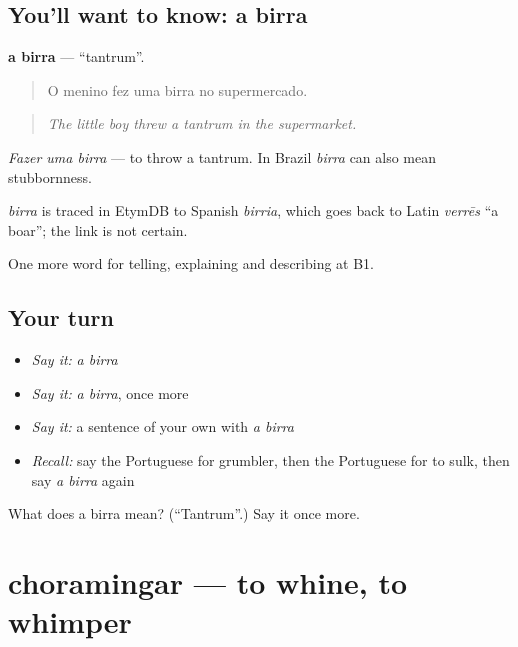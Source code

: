 \subsection*{You'll want to know: a birra}
\textbf{a birra} — \textquotedblleft{}tantrum\textquotedblright{}.

\begin{quote}
O menino fez uma birra no supermercado.
\end{quote}

\begin{quote}
\emph{The little boy threw a tantrum in the supermarket.}
\end{quote}

\emph{Fazer uma birra} — to throw a tantrum. In Brazil \emph{birra} can also mean stubbornness.

\begin{cousinweb}
\emph{birra} is traced in EtymDB to Spanish \emph{birria}, which goes back to Latin \emph{verrēs} \textquotedblleft{}a boar\textquotedblright{}; the link is not certain.
\end{cousinweb}

\begin{grammarlens}[title={What you've built}]
One more word for telling, explaining and describing at B1.
\end{grammarlens}

\subsection*{Your turn}
\begin{itemize}
\raggedright
  \item \emph{Say it:} \emph{a birra}
  \item \emph{Say it:} \emph{a birra}, once more
  \item \emph{Say it:} a sentence of your own with \emph{a birra}
  \item \emph{Recall:} say the Portuguese for grumbler, then the Portuguese for to sulk, then say \emph{a birra} again
\end{itemize}

\begin{tcolorbox}[breakable,colback=teal!4,colframe=teal!35!black,title={Before you move on}]
What does a birra mean? (\textquotedblleft{}Tantrum\textquotedblright{}.) Say it once more.
\end{tcolorbox}
\section[choramingar]{choramingar — to whine, to whimper}

